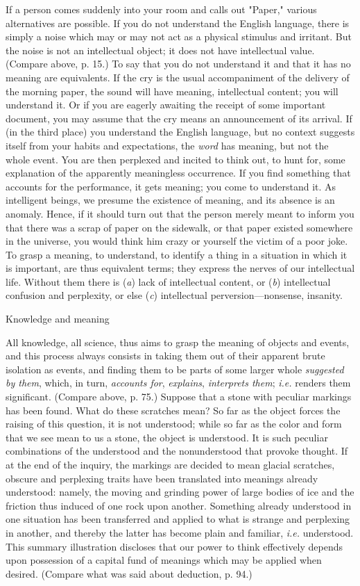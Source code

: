 \documentclass[letterpaper]{book}
\begin{document}
If a person comes suddenly into your room and calls out "Paper," various
alternatives are possible. If you do not understand the English
language, there is simply a noise which may or may not act as a physical
stimulus
and irritant. But the noise is not an intellectual object; it does not
have intellectual value. (Compare above, p. 15.) To say that you do not
understand it and that it has no meaning are equivalents. If the cry is
the usual accompaniment of the delivery of the morning paper, the sound
will have meaning, intellectual content; you will understand it. Or if
you are eagerly awaiting the receipt of some important document, you may
assume that the cry means an announcement of its arrival. If (in the
third place) you understand the English language, but no context
suggests itself from your habits and expectations, the \emph{word} has
meaning, but not the whole event. You are then perplexed and incited to
think out, to hunt for, some explanation of the apparently meaningless
occurrence. If you find something that accounts for the performance, it
gets meaning; you come to understand it. As intelligent beings, we
presume the existence of meaning, and its absence is an anomaly. Hence,
if it should turn out that the person merely meant to inform you that
there was a scrap of paper on the sidewalk, or that paper existed
somewhere in the universe, you would think him crazy or yourself the
victim of a poor joke. To grasp a meaning, to understand, to identify a
thing in a situation in which it is important, are thus equivalent
terms; they express the nerves of our intellectual life. Without them
there is (\emph{a}) lack of intellectual content, or (\emph{b})
intellectual confusion and perplexity, or else (\emph{c}) intellectual
perversion---nonsense, insanity.

Knowledge and meaning

All knowledge, all science, thus aims to grasp the meaning of objects
and events, and this process always consists in taking them out of their
apparent brute isolation as events, and finding them to be parts of
some
larger whole \emph{suggested by them}, which, in turn, \emph{accounts
for}, \emph{explains}, \emph{interprets them}; \emph{i.e.} renders them
significant. (Compare above, p. 75.) Suppose that a stone with peculiar
markings has been found. What do these scratches mean? So far as the
object forces the raising of this question, it is not understood; while
so far as the color and form that we see mean to us a stone, the object
is understood. It is such peculiar combinations of the understood and
the nonunderstood that provoke thought. If at the end of the inquiry,
the markings are decided to mean glacial scratches, obscure and
perplexing traits have been translated into meanings already understood:
namely, the moving and grinding power of large bodies of ice and the
friction thus induced of one rock upon another. Something already
understood in one situation has been transferred and applied to what is
strange and perplexing in another, and thereby the latter has become
plain and familiar, \emph{i.e.} understood. This summary illustration
discloses that our power to think effectively depends upon possession of
a capital fund of meanings which may be applied when desired. (Compare
what was said about deduction, p. 94.)
\end{document}
